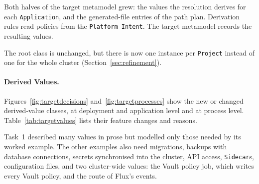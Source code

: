 Both halves of the target metamodel grew: the values the resolution
derives for each \texttt{Application}, and the generated-file entries of the
path plan. Derivation rules read policies from the \texttt{Platform Intent}.
The target metamodel records the resulting values.

The root class is unchanged, but there is now one instance per \texttt{Project}
instead of one for the whole cluster (Section~\ref{sec:refinement}).

\paragraph{Derived Values.} Figures~\ref{fig:targetdecisions} and~\ref{fig:targetprocesses} show the
new or changed derived-value classes, at deployment and application level and
at process level. Table~\ref{tab:targetvalues}
lists their feature changes and reasons.

Task~1 described many values in prose but modelled only those needed by its
worked example. The other examples also need migrations, backups with
database connections, secrets synchronised into the cluster, API access,
\texttt{Sidecar}s, configuration files, and two cluster-wide values: the
Vault policy job, which writes every Vault policy, and
the route of Flux's events.



